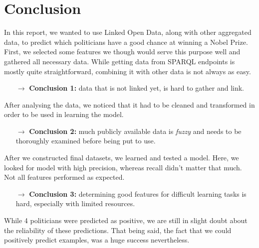 \section{Conclusion}

In this report, we wanted to use Linked Open Data, along with other aggregated data, to predict which politicians have a good chance at winning a Nobel Prize. First, we selected some features we though would serve this purpose well and gathered all necessary data. While getting data from SPARQL endpoints is mostly quite straightforward, combining it with other data is not always as easy.

\begin{itemize}
	\item[$\rightarrow$] \textbf{Conclusion 1:} data that is not linked yet, is hard to gather and link.
\end{itemize}

\noindent After analysing the data, we noticed that it had to be cleaned and transformed in order to be used in learning the model. 

\begin{itemize}
	\item[$\rightarrow$] \textbf{Conclusion 2:} much publicly available data is \emph{fuzzy} and needs to be thoroughly examined before being put to use.
\end{itemize}

\noindent After we constructed final datasets, we learned and tested a model. Here, we looked for model with high precision, whereas recall didn't matter that much. Not all features performed as expected.

\begin{itemize}
	\item[$\rightarrow$] \textbf{Conclusion 3:} determining good features for difficult learning tasks is hard, especially with limited resources.
\end{itemize}

\noindent While 4 politicians were predicted as positive, we are still in slight doubt about the reliability of these predictions. That being said, the fact that we could positively predict examples, was a huge success nevertheless. 
